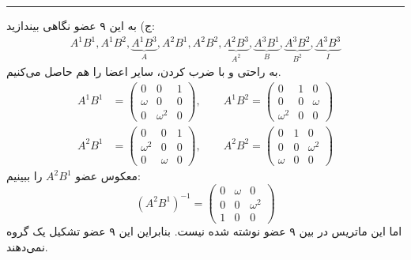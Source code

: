 \documentclass[a4paper, 12pt]{article}
\begin{document}
\par\noindent\rule{\textwidth}{0.6pt}
ج) به این ۹ عضو نگاهی بیندازید:
\begin{equation*}
	\begin{aligned}
		A^1 B^1 , A^1B^2, \underbrace{A^1B^3}_{A} , A^2B^1 , A^2B^2 , \underbrace{A^2B^3}_{A^2}, \underbrace{A^3B^1}_{B} , \underbrace{A^3B^2}_{B^2}, \underbrace{A^3B^3}_{I}
	\end{aligned}
\end{equation*}
به راحتی و با ضرب کردن، سایر اعضا را هم حاصل می‌کنیم.
\begin{equation*}
	\begin{aligned}
		A^1 B^1 &= \begin{pmatrix}
			0 & 0 & 1 \\ \omega & 0 & 0 \\ 0 & \omega^2 & 0
		\end{pmatrix} , \qquad 
		 A^1B^2 = \begin{pmatrix}
		 	0 & 1 & 0 \\ 0 & 0 & \omega \\ \omega^2 & 0 & 0
		 \end{pmatrix} \\ 
		 A^2 B^1 &= \begin{pmatrix}
		 	0 & 0 & 1 \\ \omega^2 & 0 & 0 \\ 0 & \omega & 0
		 \end{pmatrix} , \qquad 
		 A^2B^2 = \begin{pmatrix}
		 	0 & 1 & 0 \\ 0 & 0 & \omega^2 \\ \omega & 0 & 0
		 \end{pmatrix} 
	\end{aligned}
\end{equation*}
معکوس عضو 
$A^2B^1$
 را ببینیم:
 \[
 (A^2B^1)^{-1} = \begin{pmatrix}
 	0 & \omega & 0 \\ 0 & 0 & \omega^2 \\ 1 & 0 & 0
 \end{pmatrix}
 \]
 اما این ماتریس در بین ۹ عضو نوشته شده نیست. بنابراین این ۹ عضو تشکیل یک گروه نمی‌دهند.
\end{document}
